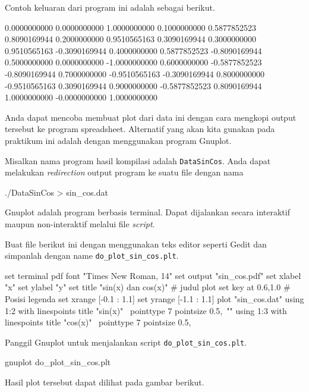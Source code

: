 \documentclass[a4paper,11pt]{extarticle}
\begin{document}
Contoh keluaran dari program ini adalah sebagai berikut.
\begin{textcode}
      0.0000000000       0.0000000000       1.0000000000
      0.1000000000       0.5877852523       0.8090169944
      0.2000000000       0.9510565163       0.3090169944
      0.3000000000       0.9510565163      -0.3090169944
      0.4000000000       0.5877852523      -0.8090169944
      0.5000000000       0.0000000000      -1.0000000000
      0.6000000000      -0.5877852523      -0.8090169944
      0.7000000000      -0.9510565163      -0.3090169944
      0.8000000000      -0.9510565163       0.3090169944
      0.9000000000      -0.5877852523       0.8090169944
      1.0000000000      -0.0000000000       1.0000000000
\end{textcode}

Anda dapat mencoba membuat plot dari data ini dengan cara mengkopi output tersebut
ke program spreadsheet.
Alternatif yang akan kita gunakan pada praktikum ini adalah dengan menggunakan
program \textsf{Gnuplot}.

Misalkan nama program hasil kompilasi adalah \texttt{DataSinCos}.
Anda dapat melakukan \textit{redirection} output program ke suatu file
dengan nama
\begin{textcode}
./DataSinCos > sin_cos.dat
\end{textcode}

Gnuplot adalah program berbasis terminal. Dapat dijalankan secara interaktif
maupun non-interaktif melalui file \textit{script}.

Buat file berikut ini dengan menggunakan teks editor seperti \textsf{Gedit}
dan simpanlah dengan name \texttt{do\_plot\_sin\_cos.plt}.
\begin{gnuplotcode}
set terminal pdf font "Times New Roman, 14"
set output "sin_cos.pdf"
set xlabel "x"
set ylabel "y"
set title "sin(x) dan cos(x)" # judul plot
set key at 0.6,1.0 # Posisi legenda
set xrange [-0.1 : 1.1]
set yrange [-1.1 : 1.1]
plot "sin_cos.dat" using 1:2 with linespoints title "sin(x)" \
                   pointtype 7 pointsize 0.5,\
                "" using 1:3 with linespoints title "cos(x)" \
                   pointtype 7 pointsize 0.5,
\end{gnuplotcode}

Panggil Gnuplot untuk menjalankan script \texttt{do\_plot\_sin\_cos.plt}.
\begin{textcode}
gnuplot do_plot_sin_cos.plt
\end{textcode}

Hasil plot tersebut dapat dilihat pada gambar berikut.
\end{document}
